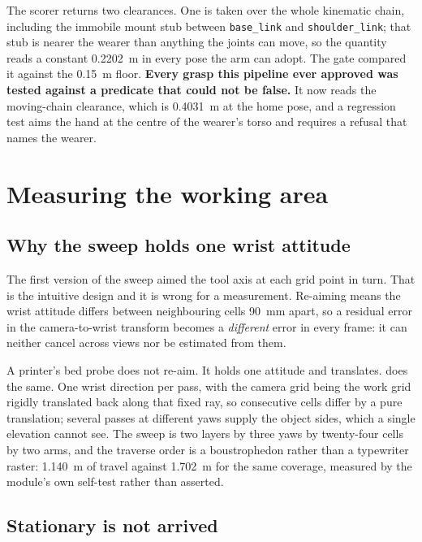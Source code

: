 The scorer returns two clearances. One is taken over the whole kinematic
chain, including the immobile mount stub between \texttt{base\_link} and
\texttt{shoulder\_link}; that stub is nearer the wearer than anything the
joints can move, so the quantity reads a constant \SI{0.2202}{\metre} in every
pose the arm can adopt. The gate compared it against the \SI{0.15}{\metre}
floor. \textbf{Every grasp this pipeline ever approved was tested against a
predicate that could not be false.} It now reads the moving-chain clearance,
which is \SI{0.4031}{\metre} at the home pose, and a regression test aims the
hand at the centre of the wearer's torso and requires a refusal that names the
wearer.

\section{Measuring the working area}

\subsection{Why the sweep holds one wrist attitude}

The first version of the sweep aimed the tool axis at each grid point in turn.
That is the intuitive design and it is wrong for a measurement. Re-aiming
means the wrist attitude differs between neighbouring cells
\SI{90}{\milli\metre} apart, so a residual error in the camera-to-wrist
transform becomes a \emph{different} error in every frame: it can neither
cancel across views nor be estimated from them.

A printer's bed probe does not re-aim. It holds one attitude and translates.
 does the same. One wrist
direction per pass, with the camera grid being the work grid rigidly
translated back along that fixed ray, so consecutive cells differ by a pure
translation; several passes at different yaws supply the object sides, which a
single elevation cannot see. The sweep is two layers by three yaws by
twenty-four cells by two arms, and the traverse order is a boustrophedon
rather than a typewriter raster: \SI{1.140}{\metre} of travel against
\SI{1.702}{\metre} for the same coverage, measured by the module's own
self-test rather than asserted.

\subsection{Stationary is not arrived}

